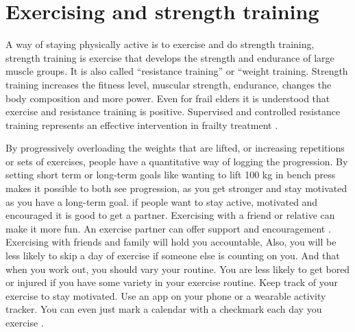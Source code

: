 \section{Exercising and strength training}
A way of staying physically active is to exercise and do strength training, strength training is exercise that develops the strength and endurance of large muscle groups. It is also called “resistance training” or “weight training\cite{Resistance}. Strength training increases the fitness level, muscular strength, endurance, changes the body composition and more power. Even for frail elders it is understood that exercise and resistance training is positive. Supervised and controlled resistance training represents an effective intervention in frailty treatment \cite{Lopesz}.

By progressively overloading the weights that are lifted, or increasing repetitions or sets of exercises, people have a quantitative way of logging the progression. By setting short term or long-term goals like wanting to lift 100 kg in bench press makes it possible to both see progression, as you get stronger and stay motivated as you have a long-term goal.
if people want to stay active, motivated and encouraged it is good to get a partner. Exercising with a friend or relative can make it more fun. An exercise partner can offer support and encouragement \cite{FriendWorkout}. Exercising with friends and family will hold you accountable, Also, you will be less likely to skip a day of exercise if someone else is counting on you. And that when you work out, you should vary your routine. You are less likely to get bored or injured if you have some variety in your exercise routine. Keep track of your exercise to stay motivated. Use an app on your phone or a wearable activity tracker. You can even just mark a calendar with a checkmark each day you exercise \cite{FriendWorkout}.
